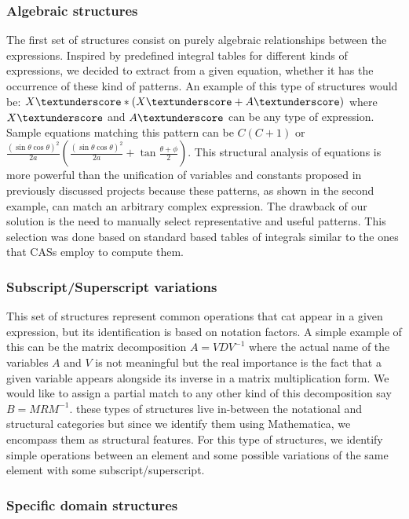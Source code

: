 \subsubsection{Algebraic structures}
The first set of structures consist on purely algebraic relationships between the expressions.
Inspired by predefined integral tables for different kinds of expressions, we decided to extract from a given equation, whether it has the occurrence of these kind of patterns.
An example of this type of structures would be: $X\textunderscore*(X\textunderscore + A\textunderscore)$ where $X\textunderscore$ and $A\textunderscore$ can be any type of expression. Sample equations matching this pattern can be $C (C+1)$ or $\frac{(\sin{\theta}\cos{\theta})^2}{2a} (\frac{(\sin{\theta}\cos{\theta})^2}{2a} + \tan{\frac{\theta+\phi}{2}})$. This structural analysis of equations is more powerful than the unification of variables and constants proposed in previously discussed projects because these patterns, as shown in the second example, can match an arbitrary complex expression. The drawback of our solution is the need to manually select representative and useful patterns. This selection was done based on standard based tables of integrals similar to the ones that CASs employ to compute them.

\subsubsection{Subscript/Superscript variations}
This set of structures represent common operations that cat appear in a given expression, but its identification is based on notation factors. A simple example of this can be the matrix decomposition $A = VDV^{-1}$ where the actual name of the variables $A$ and $V$ is not meaningful but the real importance is the fact that a given variable appears alongside its inverse in a matrix multiplication form. We would like to assign a partial match to any other kind of this decomposition say $B = MRM^{-1}$. these types of structures live in-between the notational and structural categories but since we identify them using Mathematica, we encompass them as structural features. For this type of structures, we identify simple operations between an element and some possible variations of the same element with some subscript/superscript.

\subsubsection{Specific domain structures}

